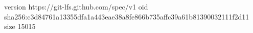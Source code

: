 version https://git-lfs.github.com/spec/v1
oid sha256:c3d84761a13355dfa1a443eae38a8fe866b735affc39a61b81390032111f2d11
size 15015
